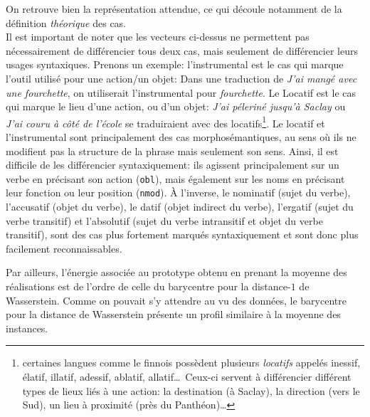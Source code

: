 \documentclass{cours}
\begin{document}
On retrouve bien la représentation attendue, ce qui découle notamment de la définition \emph{théorique} des cas. \\
Il est important de noter que les vecteurs ci-dessus ne permettent pas nécessairement de différencier tous deux cas, mais seulement de différencier leurs usages syntaxiques.
Prenons un exemple:
l'instrumental est le cas qui marque l'outil utilisé pour une action/un objet: Dans une traduction de \textsl{J'ai mangé \emph{avec} une fourchette}, on utiliserait l'instrumental pour \textsl{fourchette}.
Le Locatif est le cas qui marque le lieu d'une action, ou d'un objet: \textsl{J'ai péleriné jusqu'à Saclay} ou \textsl{J'ai couru à côté de l'école} se traduiraient avec des locatifs\footnote{certaines langues comme le finnois possèdent plusieurs \textit{locatifs} appelés inessif, élatif, illatif, adessif, ablatif, allatif\dots\ Ceux-ci servent à différencier différent types de lieux liés à une action: la destination (à Saclay), la direction (vers le Sud), un lieu à proximité (près du Panthéon)\ldots}.
Le locatif et l'instrumental sont principalement des cas morphosémantiques, au sens où ils ne modifient pas la structure de la phrase mais seulement son sens.
Ainsi, il est difficile de les différencier syntaxiquement: ils agissent principalement sur un verbe en précisant son action (\texttt{obl}), mais également sur les noms en précisant leur fonction ou leur position (\texttt{nmod}).
À l'inverse, le nominatif (sujet du verbe), l'accusatif (objet du verbe), le datif (objet indirect du verbe), l'ergatif (sujet du verbe transitif) et l'absolutif (sujet du verbe intransitif et objet du verbe transitif), sont des cas plus fortement marqués syntaxiquement et sont donc plus facilement reconnaissables.

\medskip
Par ailleurs, l'énergie associée au prototype obtenu en prenant la moyenne des réalisations est de l'ordre de celle du barycentre pour la distance-$1$ de Wasserstein.
Comme on pouvait s'y attendre au vu des données, le barycentre pour la distance de Wasserstein présente un profil similaire à la moyenne des instances.
\end{document}
